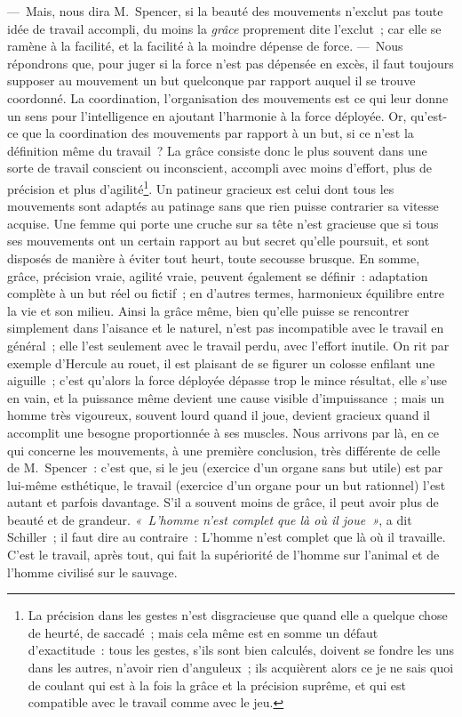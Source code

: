\documentclass[french,twoside]{book} %
\begin{document}
— Mais, nous dira M. Spencer, si la beauté des mouvements n’exclut pas toute idée de travail accompli, du moins la \emph{grâce} proprement dite l’exclut ; car elle se ramène à la facilité, et la facilité à la moindre dépense de force. — Nous  répondrons que, pour juger si la force n’est pas dépensée en excès, il faut toujours supposer au mouvement un but quelconque par rapport auquel il se trouve coordonné. La coordination, l’organisation des mouvements est ce qui leur donne un sens pour l’intelligence en ajoutant l’harmonie à la force déployée. Or, qu’est-ce que la coordination des mouvements par rapport à un but, si ce n’est la définition même du travail ? La grâce consiste donc le plus souvent dans une sorte de travail conscient ou inconscient, accompli avec moins d’effort, plus de précision et plus d’agilité\footnote{La précision dans les gestes n’est disgracieuse que quand elle a quelque chose de heurté, de saccadé ; mais cela même est en somme un défaut d’exactitude : tous les gestes, s’ils sont bien calculés, doivent se fondre les uns dans les autres, n’avoir rien d’anguleux ; ils acquièrent alors ce je ne sais quoi de coulant qui est à la fois la grâce et la précision suprême, et qui est compatible avec le travail comme avec le jeu.}. Un patineur gracieux est celui dont tous les mouvements sont adaptés au patinage sans que rien puisse contrarier sa vitesse acquise. Une femme qui porte une cruche sur sa tête n’est gracieuse que si tous ses mouvements ont un certain rapport au but secret qu’elle poursuit, et sont disposés de manière à éviter tout heurt, toute secousse brusque. En somme, grâce, précision vraie, agilité vraie, peuvent également se définir : adaptation complète à un but réel ou fictif ; en d’autres termes, harmonieux équilibre entre la vie et son milieu. Ainsi la grâce même, bien qu’elle puisse se rencontrer simplement dans l’aisance et le naturel, n’est pas incompatible avec le travail en général ; elle l’est seulement avec le travail perdu, avec l’effort inutile. On rit par exemple d’Hercule au rouet, il est plaisant de se  figurer un colosse enfilant une aiguille ; c’est qu’alors la force déployée dépasse trop le mince résultat, elle s’use en vain, et la puissance même devient une cause visible d’impuissance ; mais un homme très vigoureux, souvent lourd quand il joue, devient gracieux quand il accomplit une besogne proportionnée à ses muscles. Nous arrivons par là, en ce qui concerne les mouvements, à une première conclusion, très différente de celle de M. Spencer : c’est que, si le jeu (exercice d’un organe sans but utile) est par lui-même esthétique, le travail (exercice d’un organe pour un but rationnel) l’est autant et parfois davantage. S’il a souvent moins de grâce, il peut avoir plus de beauté et de grandeur. \emph{« L’homme n’est complet que là où il joue »}, a dit Schiller ; il faut dire au contraire : L’homme n’est complet que là où il travaille. C’est le travail, après tout, qui fait la supériorité de l’homme sur l’animal et de l’homme civilisé sur le sauvage.\par
\end{document}
